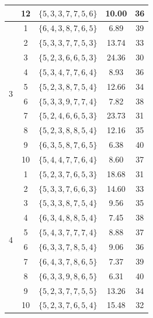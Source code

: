 \begin{table}
\begin{tabular}{ |c c c c c|  }
                           & 12 & $\{5, 3, 3, 7, 7, 5, 6\}$ & 10.00 & 36 \\
        \hline
        \multirow{10}{*}{3} & 1  & $\{6, 4, 3, 8, 7, 6, 5\}$ & 6.89  & 39 \\
                           & 2  & $\{5, 3, 3, 7, 7, 5, 3\}$ & 13.74 & 33 \\
                           & 3  & $\{5, 2, 3, 6, 6, 5, 3\}$ & 24.36 & 30 \\
                           & 4  & $\{5, 3, 4, 7, 7, 6, 4\}$ & 8.93 & 36 \\
                           & 5  & $\{5, 2, 3, 8, 7, 5, 4\}$ & 12.66 & 34 \\
                           & 6  & $\{5, 3, 3, 9, 7, 7, 4\}$ & 7.82 & 38 \\
                           & 7  & $\{5, 2, 4, 6, 6, 5, 3\}$ & 23.73 & 31 \\
                           & 8  & $\{5, 2, 3, 8, 8, 5, 4\}$ & 12.16 & 35 \\
                           & 9  & $\{6, 3, 5, 8, 7, 6, 5\}$ & 6.38 & 40 \\
                           & 10 & $\{5, 4, 4, 7, 7, 6, 4\}$ & 8.60 & 37 \\
        \hline
        \multirow{10}{*}{4} & 1  & $\{5, 2, 3, 7, 6, 5, 3\}$ & 18.68  & 31 \\
                           & 2  & $\{5, 3, 3, 7, 6, 6, 3\}$ & 14.60 & 33 \\
                           & 3  & $\{5, 3, 3, 8, 7, 5, 4\}$ & 9.56 & 35 \\
                           & 4  & $\{6, 3, 4, 8, 8, 5, 4\}$ & 7.45 & 38 \\
                           & 5  & $\{5, 4, 3, 7, 7, 7, 4\}$ & 8.88 & 37 \\
                           & 6  & $\{6, 3, 3, 7, 8, 5, 4\}$ & 9.06 & 36 \\
                           & 7  & $\{6, 4, 3, 7, 8, 6, 5\}$ & 7.37 & 39 \\
                           & 8  & $\{6, 3, 3, 9, 8, 6, 5\}$ & 6.31 & 40 \\
                           & 9  & $\{5, 2, 3, 7, 7, 5, 5\}$ & 13.26 & 34 \\
                           & 10 & $\{5, 2, 3, 7, 6, 5, 4\}$ & 15.48 & 32 \\
        \hline
    \end{tabular}
    
    \label{tab:our_solutions}
\end{table}

